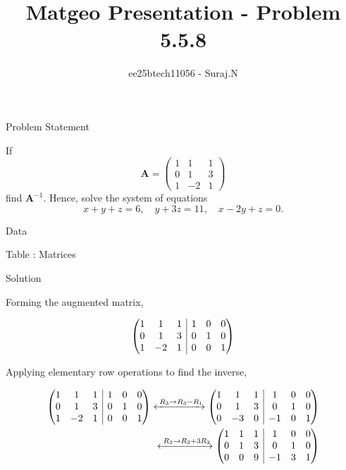 \documentclass{beamer}
\title{Matgeo Presentation - Problem 5.5.8}
\author{ee25btech11056 - Suraj.N}
\makeatletter
\numberwithin{equation}{section}
\theoremstyle{remark}
\newcommand{\myvec}[1]{\ensuremath{\begin{pmatrix}#1\end{pmatrix}}}
\newenvironment{amatrix}[1]{%
  \left(\begin{array}{@{}*{#1}{c}|*{#1}{c}@{}}
}{%
  \end{array}\right)
}
\newcommand{\myaugvec}[2]{\ensuremath{\begin{amatrix}{#1}#2\end{amatrix}}}
\let\vec\mathbf
\makeatother
\begin{document}
\begin{frame}
  \titlepage
\end{frame}

\begin{frame}{Problem Statement}

If 
\[
\vec{A} = \myvec{1 & 1 & 1 \\ 0 & 1 & 3 \\ 1 & -2 & 1}
\]
find $\vec{A}^{-1}$. Hence, solve the system of equations
\[
x+y+z=6,\quad y+3z=11,\quad x-2y+z=0.
\]
\end{frame}

\begin{frame}{Data}

\begin{table}[h!]
  \centering
  
  \caption*{Table : Matrices}
  \label{5.5.8}
\end{table}

\end{frame}

\begin{frame}{Solution}

Forming the augmented matrix,

\begin{align}
  \myaugvec{3}{1 & 1 & 1 & 1 & 0 & 0\\0 & 1 & 3 & 0 & 1 & 0\\1 & -2 & 1 & 0 & 0 & 1 }
\end{align}

Applying elementary row operations to find the inverse,

\begin{align}
\myaugvec{3}{1 & 1 & 1 & 1 & 0 & 0\\0 & 1 & 3 & 0 & 1 & 0\\1 & -2 & 1 & 0 & 0 & 1 }
\xleftrightarrow{\;R_3 \to R_3 - R_1}
\myaugvec{3}{1 & 1 & 1 & 1 & 0 & 0\\0 & 1 & 3 & 0 & 1 & 0\\0 & -3 & 0 & -1 & 0 & 1 }\\
\xleftrightarrow{\;R_3 \to R_3 + 3R_2}
\myaugvec{3}{1 & 1 & 1 & 1 & 0 & 0\\0 & 1 & 3 & 0 & 1 & 0\\0 & 0 & 9 & -1 & 3 & 1 }
\end{align}

\end{frame}
\end{document}
